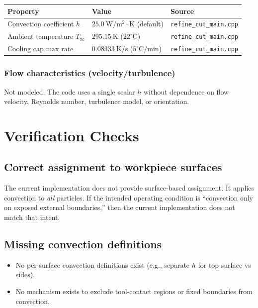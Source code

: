 \documentclass[11pt]{article}
\begin{document}
\begin{center}
\begin{tabular}{lll}
\toprule
Property & Value & Source \\
\midrule
Convection coefficient $h$ & $25.0\ \mathrm{W/m^2\cdot K}$ (default) & \texttt{refine\_cut\_main.cpp} \\
Ambient temperature $T_\infty$ & $295.15\ \mathrm{K}$ ($22^\circ\mathrm{C}$) & \texttt{refine\_cut\_main.cpp} \\
Cooling cap $\mathrm{max\_rate}$ & $0.08333\ \mathrm{K/s}$ ($5^\circ\mathrm{C/min}$) & \texttt{refine\_cut\_main.cpp} \\
\bottomrule
\end{tabular}
\end{center}

\subsubsection{Flow characteristics (velocity/turbulence)}

Not modeled. The code uses a single scalar $h$ without dependence on flow velocity, Reynolds number, turbulence model, or orientation.

\section{Verification Checks}

\subsection{Correct assignment to workpiece surfaces}

The current implementation does not provide surface-based assignment. It applies convection to \emph{all} particles. If the intended operating condition is ``convection only on exposed external boundaries,'' then the current implementation does not match that intent.

\subsection{Missing convection definitions}

\begin{itemize}
  \item No per-surface convection definitions exist (e.g., separate $h$ for top surface vs sides).
  \item No mechanism exists to exclude tool-contact regions or fixed boundaries from convection.
\end{itemize}
\end{document}
